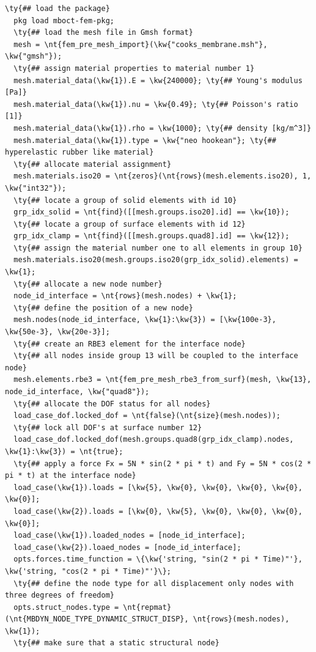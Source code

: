 \begin{Verbatim}[commandchars=\\\{\}]
  \ty{## load the package}
  pkg load mboct-fem-pkg;
  \ty{## load the mesh file in Gmsh format}
  mesh = \nt{fem_pre_mesh_import}(\kw{"cooks_membrane.msh"}, \kw{"gmsh"});
  \ty{## assign material properties to material number 1}
  mesh.material_data(\kw{1}).E = \kw{240000}; \ty{## Young's modulus [Pa]}
  mesh.material_data(\kw{1}).nu = \kw{0.49}; \ty{## Poisson's ratio [1]}
  mesh.material_data(\kw{1}).rho = \kw{1000}; \ty{## density [kg/m^3]}
  mesh.material_data(\kw{1}).type = \kw{"neo hookean"}; \ty{## hyperelastic rubber like material}
  \ty{## allocate material assignment}
  mesh.materials.iso20 = \nt{zeros}(\nt{rows}(mesh.elements.iso20), 1, \kw{"int32"});
  \ty{## locate a group of solid elements with id 10}
  grp_idx_solid = \nt{find}([[mesh.groups.iso20].id] == \kw{10});
  \ty{## locate a group of surface elements with id 12}
  grp_idx_clamp = \nt{find}([[mesh.groups.quad8].id] == \kw{12});
  \ty{## assign the material number one to all elements in group 10}
  mesh.materials.iso20(mesh.groups.iso20(grp_idx_solid).elements) = \kw{1};
  \ty{## allocate a new node number}
  node_id_interface = \nt{rows}(mesh.nodes) + \kw{1};
  \ty{## define the position of a new node}
  mesh.nodes(node_id_interface, \kw{1}:\kw{3}) = [\kw{100e-3}, \kw{50e-3}, \kw{20e-3}];
  \ty{## create an RBE3 element for the interface node}
  \ty{## all nodes inside group 13 will be coupled to the interface node}
  mesh.elements.rbe3 = \nt{fem_pre_mesh_rbe3_from_surf}(mesh, \kw{13}, node_id_interface, \kw{"quad8"});
  \ty{## allocate the DOF status for all nodes}
  load_case_dof.locked_dof = \nt{false}(\nt{size}(mesh.nodes));
  \ty{## lock all DOF's at surface number 12}
  load_case_dof.locked_dof(mesh.groups.quad8(grp_idx_clamp).nodes, \kw{1}:\kw{3}) = \nt{true};
  \ty{## apply a force Fx = 5N * sin(2 * pi * t) and Fy = 5N * cos(2 * pi * t) at the interface node}
  load_case(\kw{1}).loads = [\kw{5}, \kw{0}, \kw{0}, \kw{0}, \kw{0}, \kw{0}];
  load_case(\kw{2}).loads = [\kw{0}, \kw{5}, \kw{0}, \kw{0}, \kw{0}, \kw{0}];
  load_case(\kw{1}).loaded_nodes = [node_id_interface];
  load_case(\kw{2}).loaed_nodes = [node_id_interface];
  opts.forces.time_function = \{\kw{'string, "sin(2 * pi * Time)"'}, \kw{'string, "cos(2 * pi * Time)"'}\};
  \ty{## define the node type for all displacement only nodes with three degrees of freedom}
  opts.struct_nodes.type = \nt{repmat}(\nt{MBDYN_NODE_TYPE_DYNAMIC_STRUCT_DISP}, \nt{rows}(mesh.nodes), \kw{1});
  \ty{## make sure that a static structural node}

\end{Verbatim}
